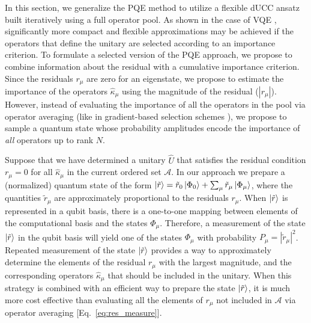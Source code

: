 \documentclass[aps,prx, reprint]{revtex4-2}
\begin{document}
In this section, we generalize the PQE method to utilize a flexible dUCC ansatz built iteratively using a full operator pool.
As shown in the case of VQE \cite{grimsley2019adaptive, ryabinkin2020iterative}, significantly more compact and flexible approximations may be achieved if the operators that define the unitary are selected according to an importance criterion.
To formulate a selected version of the PQE approach, we propose to combine information about the residual with a cumulative importance criterion.
Since the residuals $r_\mu$ are zero for an eigenstate, we propose to estimate the importance of the operators $\hat{\kappa}_\mu$ using the magnitude of the residual ($|r_\mu|$).
However, instead of evaluating the importance of all the operators in the pool via operator averaging (like in gradient-based selection schemes \cite{grimsley2019adaptive, ryabinkin2020iterative}), we propose to sample a quantum state whose probability amplitudes encode the importance of \textit{all} operators up to rank $N$.

Suppose that we have determined a unitary $\hat{U}$ that satisfies the  residual condition $r_\mu = 0$ for all $\hat{\kappa}_\mu$ in the current ordered set $\mathcal{A}$.
In our approach we prepare a (normalized) quantum state of the form $
\ket{\tilde{r}}  = \tilde{r}_0 \ket{\Phi_0} + \sum_\mu \tilde{r}_\mu \ket{\Phi_\mu}$,
where the quantities $ \tilde{r}_\mu $ are approximately proportional to the residuals $r_\mu$.
When $\ket{\tilde{r}}$ is represented in a qubit basis, there is a one-to-one mapping between elements of the computational basis and the states $\Phi_\mu$.
Therefore, a measurement of the state $\ket{\tilde{r}}$ in the
qubit basis will yield one of the states $\Phi_\mu$ with probability $P_\mu = |\tilde{r}_\mu|^2$.
Repeated measurement of the state $\ket{\tilde{r}}$ provides a way to approximately determine the elements of the residual $r_\mu$ with the largest magnitude, and the corresponding operators $\hat{\kappa}_\mu$ that should be included in the unitary.
 When this strategy is combined with an efficient way to prepare the state $\ket{\tilde{r}}$, it is much more cost effective than evaluating all the elements of $r_\mu$ not included in $\mathcal{A}$ via operator averaging [Eq.~\eqref{eq:res_measure}].
\end{document}
